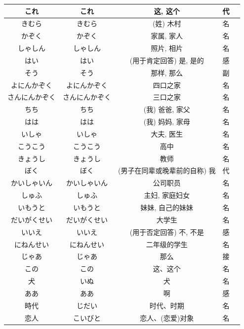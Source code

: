 \begin{longtable}{|c|c|c|c|c|}
これ & これ & 这, 这个 & 代 & \\ \hline
きむら & きむら & (姓) 木村 & 名 & \\ \hline
かぞく & かぞく & 家属, 家人 & 名 & \\ \hline
しゃしん & しゃしん & 照片, 相片 & 名 & \\ \hline
はい & はい & (用于肯定回答) 是, 是的 & 感 & \\ \hline
そう & そう & 那样, 那么 & 副 & \\ \hline
よにんかぞく & よにんかぞく & 四口之家 & 名 & \\ \hline
さんにんかぞく & さんにんかぞく & 三口之家 & 名 & \\ \hline
ちち & ちち & (我) 爸爸, 家父 & 名 & \\ \hline
はは & はは & (我) 妈妈, 家母 & 名 & \\ \hline
いしゃ & いしゃ & 大夫, 医生 & 名 & \\ \hline
こうこう & こうこう & 高中 & 名 & \\ \hline
きょうし & きょうし & 教师 & 名 & \\ \hline
ぼく & ぼく & (男子在同辈或晚辈前的自称) 我 & 代 & \\ \hline
かいしゃいん & かいしゃいん & 公司职员 & 名 & \\ \hline
しゅふ & しゅふ & 主妇, 家庭妇女 & 名 & \\ \hline
いもうと & いもうと & 妹妹, 自己的妹妹 & 名 & \\ \hline
だいがくせい & だいがくせい & 大学生 & 名 & \\ \hline
いいえ & いいえ & (用于否定回答) 不, 不是 & 感 & \\ \hline
にねんせい & にねんせい & 二年级的学生 & 名 & \\ \hline
じゃあ & じゃあ & 那么 & 接 & \\ \hline
この & この & 这、这个 & 名 & \\ \hline
犬 & いぬ & 犬 & 名 & \\ \hline
ああ & ああ& 啊 & 感 & \\ \hline
時代 &じだい& 时代、时期 & 名 & \\ \hline
恋人 & こいびと & 恋人、(恋爱)对象  & 名 & \\ \hline
        
\end{longtable}

